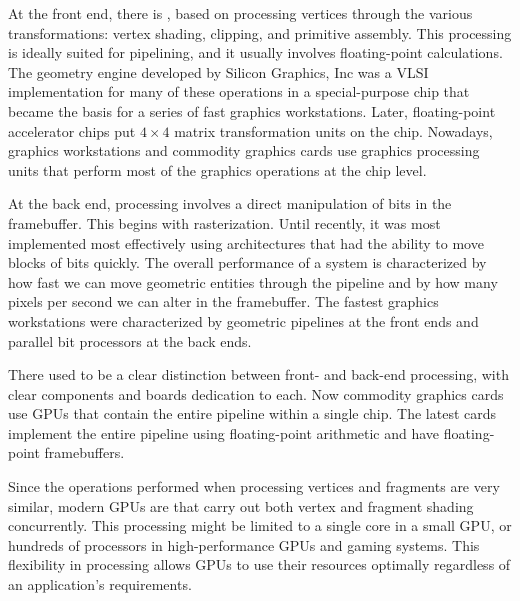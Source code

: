 \documentclass[../COS3712_Notes.tex]{subfiles}
\begin{document}
      At the front end,
      there is ,
      based on processing vertices through the various transformations:
      vertex shading, clipping, and primitive assembly.
      This processing is ideally suited for pipelining,
      and it usually involves floating-point calculations.
      The geometry engine developed by Silicon Graphics, Inc
      was a VLSI implementation for many of these operations
      in a special-purpose chip that became
      the basis for a series of fast graphics workstations.
      Later, floating-point accelerator chips put
      $4 \times 4$ matrix transformation units on the chip.
      Nowadays, graphics workstations and commodity graphics cards use
      graphics processing units that perform most of the graphics operations
      at the chip level.

      At the back end,
      processing involves a direct manipulation of bits in the framebuffer.
      This begins with rasterization.
      Until recently, it was most implemented most effectively using architectures
      that had the ability to move blocks of bits quickly.
      The overall performance of a system is characterized by
      how fast we can move geometric entities through the pipeline
      and by how many pixels per second we can alter in the framebuffer.
      The fastest graphics workstations were characterized by
      geometric pipelines at the front ends
      and parallel bit processors at the back ends.

      There used to be a clear distinction between
      front- and back-end processing,
      with clear components and boards dedication to each.
      Now commodity graphics cards use GPUs that contain the entire pipeline
      within a single chip.
      The latest cards implement the entire pipeline using floating-point arithmetic
      and have floating-point framebuffers.

      Since the operations performed when processing vertices and fragments are very similar,
      modern GPUs are 
      that carry out both vertex and fragment shading concurrently.
      This processing might be limited to a single core in a small GPU,
      or hundreds of processors in high-performance GPUs and gaming systems.
      This flexibility in processing allows GPUs to use their resources optimally
      regardless of an application's requirements.
\end{document}
